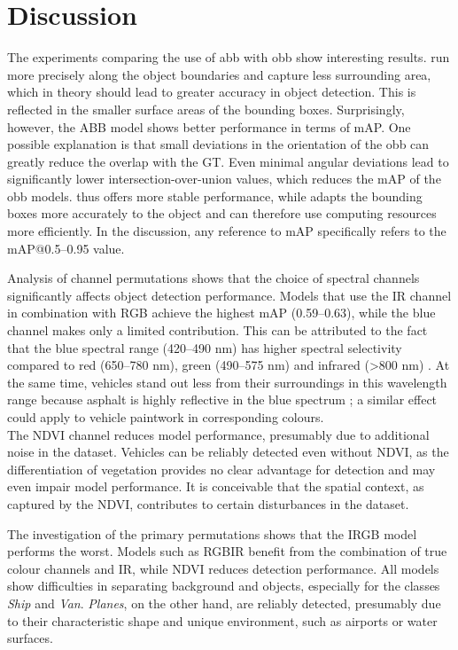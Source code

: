 \chapter{Discussion}
\label{ch:discussion}


The experiments comparing the use of \acrlong{abb} with \acrlong{obb} show interesting results.  run more precisely along the object boundaries and capture less surrounding area, which in theory should lead to greater accuracy in object detection. This is reflected in the smaller surface areas of the bounding boxes. Surprisingly, however, the ABB model shows better performance in terms of \Acrlong{mAP}. One possible explanation is that small deviations in the orientation of the \acrshort{obb} can greatly reduce the overlap with the \Acrlong{GT}. Even minimal angular deviations lead to significantly lower intersection-over-union values, which reduces the \acrshort{mAP} of the \acrshort{obb} models.  thus offers more stable performance, while  adapts the bounding boxes more accurately to the object and can therefore use computing resources more efficiently. In the discussion, any reference to \acrshort{mAP} specifically refers to the \acrshort{mAP}@0.5--0.95 value.
 
Analysis of channel permutations shows that the choice of spectral channels significantly affects object detection performance. Models that use the \acrshort{IR} channel in combination with \acrshort{RGB} achieve the highest mAP (0.59–0.63), while the blue channel makes only a limited contribution. This can be attributed to the fact that the blue spectral range (420–490 nm) has higher spectral selectivity compared to red (650–780 nm), green (490–575 nm) and infrared (>800 nm) \cite{bfs_Strahlung}. At the same time, vehicles stand out less from their surroundings in this wavelength range because asphalt is highly reflective in the blue spectrum \cite{Singh2013}; a similar effect could apply to vehicle paintwork in corresponding colours. \\
The \acrshort{NDVI} channel reduces model performance, presumably due to additional noise in the dataset. Vehicles can be reliably detected even without \acrshort{NDVI}, as the differentiation of vegetation provides no clear advantage for detection and may even impair model performance. It is conceivable that the spatial context, as captured by the \acrshort{NDVI}, contributes to certain disturbances in the dataset.

The investigation of the primary permutations shows that the IRGB model performs the worst. Models such as \acrshort{RGBIR} benefit from the combination of true colour channels and \acrshort{IR}, while \acrshort{NDVI} reduces detection performance. All models show difficulties in separating background and objects, especially for the classes \textit{Ship} and \textit{Van}. \textit{Planes}, on the other hand, are reliably detected, presumably due to their characteristic shape and unique environment, such as airports or water surfaces.
 
